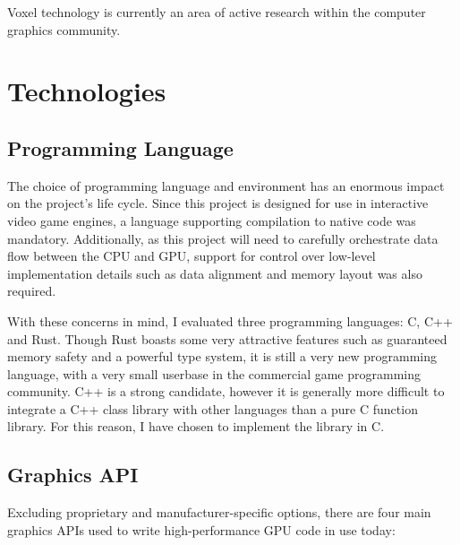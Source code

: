 Voxel technology is currently an area of active research within the computer graphics community. 


\section{Technologies}
\subsection{Programming Language}
The choice of programming language and environment has an enormous impact on the project's life cycle. Since this project is designed for use in interactive video game engines, a language supporting compilation to native code was mandatory. Additionally, as this project will need to carefully orchestrate data flow between the CPU and GPU, support for control over low-level implementation details such as data alignment and memory layout was also required.

With these concerns in mind, I evaluated three programming languages: C, C++ and Rust. Though Rust boasts some very attractive features such as guaranteed memory safety and a powerful type system, it is still a very new programming language, with a very small userbase in the commercial game programming community. C++ is a strong candidate, however it is generally more difficult to integrate a C++ class library with other languages than a pure C function library. For this reason, I have chosen to implement the library in C.

\subsection{Graphics API}
Excluding proprietary and manufacturer-specific options, there are four main graphics APIs used to write high-performance GPU code in use today:

